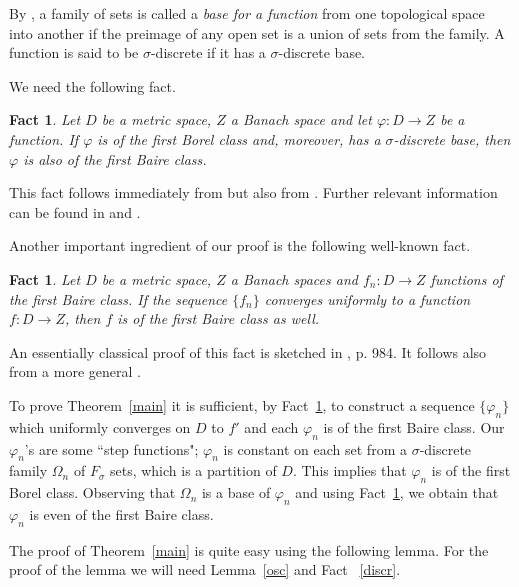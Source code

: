 \documentclass[12pt,a4paper]{amsart}
\theoremstyle{plain}
\newtheorem{fact}[theorem]{Fact}
\theoremstyle{definition}
\theoremstyle{remark}
\numberwithin{equation}{section}
\newcommand{\vf}{\varphi}
\begin{document}
By \cite{Ha},  a family of sets is called a {\em base for a function} from one topological space into
another if the preimage of any open set is a union of sets from the family.
A function is said to be $\sigma$-discrete if it has a $\sigma$-discrete base. 

We  need the following fact.

\begin{fact}\label{basef}
Let $D$ be a metric space, $Z$ a Banach space  and let $\varphi:D\to Z$ be a  function.  If $\varphi$ is of the first Borel class and, moreover, has a $\sigma$-discrete base, then $\vf$ is also of the first Baire class.
\end{fact}
This fact follows immediately from \cite[Theorem 2]{F} but also from \cite[Theorem 1, Theorem 2 (b)]{Rog}. Further relevant information
 can be found in \cite{V} and \cite{Rog}.

Another important ingredient of our proof is the following well-known fact.



\begin{fact}\label{unif}
Let $D$ be a metric space, $Z$ a Banach spaces and $f_n:D \to Z$ functions of the first Baire class.
 If the sequence $\{f_n\}$ converges uniformly to a function $f:D\to Z$, then $f$ is of the first Baire class
 as well.
\end{fact}
An essentially classical proof of this fact  is sketched in \cite{S}, p. 984. It follows  also from  a more general \cite[Lemma 1]{Rol}.


 	

To prove Theorem~\ref{main} it is sufficient, by Fact~\ref{unif}, to
 construct a sequence   $\{\vf_n\}$ which uniformly converges on $D$ to $f'$ and each $\vf_n$
  is of the first Baire class.  Our $\vf_n$'s are  some ``step functions"; $\vf_n$ is constant on
	 each set from a  $\sigma$-discrete  family $\Omega_n$ of $F_{\sigma}$ sets, which  is a partition 
	 of $D$. This implies that $\vf_n$ is  of the first Borel class. Observing that $\Omega_n$
	 is a base of $\vf_n$ and using Fact~\ref{basef}, we obtain that   $\vf_n$ is  even of the first Baire class.
	
	
The proof of Theorem~\ref{main}   is quite easy using the following lemma. For the proof of the lemma we will need
 Lemma~\ref{osc} and Fact ~\ref{discr}.
\end{document}
